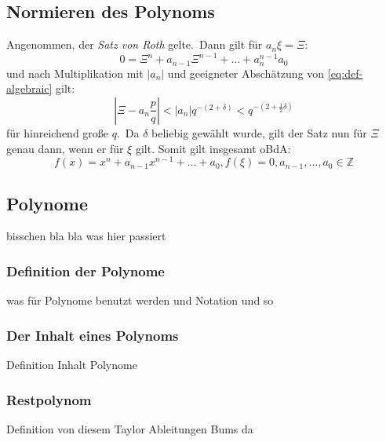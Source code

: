 \documentclass[11pt]{article}
\begin{document}
        \subsection{Normieren des Polynoms}
        \label{subsec:norm-poly}
            \textrm{Angenommen, der \emph{Satz von Roth} gelte.\ Dann gilt für $a_n \xi = \Xi$:}
            \begin{equation*}
                0 = \Xi^n + a_{n-1} \Xi^{n-1} + \dots + a_n^{n-1} a_0
            \end{equation*}
            \textrm{und nach Multiplikation mit $|a_n|$ und geeigneter Abschätzung von \cref{eq:def-algebraic} gilt:}
            \begin{equation*}
                | \Xi - a_n \frac{p}{q} | < |a_n| q^{-(2+\delta)} < q^{-(2+\frac{1}{2}\delta)}
            \end{equation*}
            \textrm{für hinreichend große $q$.\ Da $\delta$ beliebig gewählt wurde, gilt der Satz nun für $\Xi$ genau
            dann, wenn er für $\xi$ gilt. Somit gilt insgesamt oBdA:}
            \begin{equation}
                f(x) = x^n + a_{n-1} x^{n-1} + \dots + a_0 \label{eq:prereq}, f(\xi) = 0, a_{n-1}, \dots, a_0 \in \mathbb{Z}
            \end{equation}

        \subsection{Polynome}
        \label{subsec:polynomials}
            bisschen bla bla was hier passiert
        
            \subsubsection{Definition der Polynome}
            \label{subsubsec:poly-def}
                \textrm{was für Polynome benutzt werden und Notation und so}
            
            \subsubsection{Der Inhalt eines Polynoms}
            \label{subsubsec:content-poly}
                Definition Inhalt Polynome
            
            \subsubsection{Restpolynom}
            \label{subsubsec:rem-poly}
                Definition von diesem Taylor Ableitungen Bums da
            
\end{document}

